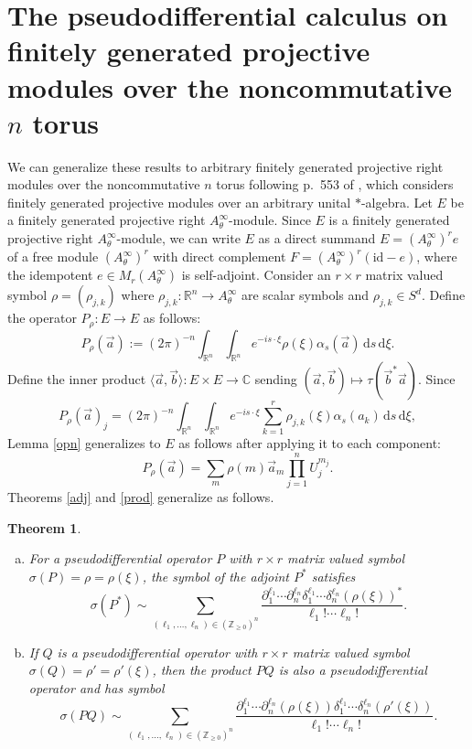 \documentclass[10pt]{article}
\newtheorem{thm}{Theorem}[section]
\theoremstyle{remark}
\theoremstyle{definition}
\begin{document}
\section{The pseudodifferential calculus on finitely generated projective
modules over the noncommutative $n$ torus}
We can generalize these results to arbitrary finitely generated projective
right modules over the noncommutative $n$ torus following p.~553 of \cite{ncg},
which considers finitely generated projective modules over an arbitrary unital
$*$-algebra. Let $E$ be a finitely generated projective right
$A_{\theta}^{\infty}$-module. Since $E$ is a finitely generated
projective right $A_{\theta}^{\infty}$-module, we can write $E$ as a direct
summand $E=(A_{\theta}^{\infty})^re$ of a free module $(A_{\theta}^{\infty})^r$
with direct complement
$F=(A_{\theta}^{\infty})^r(\mathrm{id}-e)$,
where the idempotent $e\in M_r(A_{\theta}^{\infty})$ is self-adjoint.
Consider an $r\times r$ matrix valued symbol $\rho=(\rho_{j,k})$ where
$\rho_{j,k}:\mathbb R^n\rightarrow A_{\theta}^{\infty}$ are scalar symbols
and $\rho_{j,k}\in S^d$. Define the operator $P_{\rho}:E\rightarrow E$ as
follows:
$$P_{\rho}(\vec{a}):=(2\pi)^{-n}\int_{\mathbb R^n}\!\int_{\mathbb R^n}\!
e^{-is\cdot\xi}\rho(\xi)\alpha_s(\vec{a})\,\mathrm ds\,\mathrm d\xi.$$
Define the inner product
$\langle\vec{a},\vec{b}\rangle:E\times E\rightarrow\mathbb C$
sending $(\vec{a},\vec{b})\mapsto\tau(\vec{b}^*\vec{a})$.
Since $$P_{\rho}(\vec{a})_j
=(2\pi)^{-n}\int_{\mathbb R^n}\!\int_{\mathbb R^n}\!e^{-is\cdot\xi}
\sum_{k=1}^r\rho_{j,k}(\xi)\alpha_s(a_k)\,\mathrm ds\,\mathrm d\xi,$$
Lemma \ref{opn} generalizes to $E$ as follows after applying it to each
component:
$$P_{\rho}(\vec{a})=\sum_m\rho(m)\vec{a}_m\prod_{j=1}^nU_j^{m_j}.$$
Theorems \ref{adj} and \ref{prod} generalize as follows.
\begin{thm}\label{mvs2}
\begin{enumerate}[(a)]
\item For a pseudodifferential operator $P$ with $r\times r$ matrix valued
symbol $\sigma(P)=\rho=\rho(\xi)$, the
symbol of the adjoint $P^*$ satisfies
$$\sigma(P^*)\sim\sum_{(\ell_1,\ldots,\ell_n)\in(\mathbb Z_{\ge 0})^n}
\frac{\partial_1^{\ell_1}\cdots\partial_n^{\ell_n}
\delta_1^{\ell_1}\cdots\delta_n^{\ell_n}(\rho(\xi))^*}{\ell_1!\cdots\ell_n!}.$$
\item If $Q$ is a pseudodifferential operator with $r\times r$ matrix valued symbol
$\sigma(Q)=\rho'=\rho'(\xi)$,
then the product $PQ$ is also a pseudodifferential operator and has symbol
$$\sigma(PQ)\sim\sum_{(\ell_1,\ldots,\ell_n)\in(\mathbb Z_{\ge 0})^n}
\frac{\partial_1^{\ell_1}\cdots\partial_n^{\ell_n}(\rho(\xi))
\delta_1^{\ell_1}\cdots\delta_n^{\ell_n}(\rho'(\xi))}{\ell_1!\cdots\ell_n!}.$$
\end{enumerate}
\end{thm}
\end{document}

